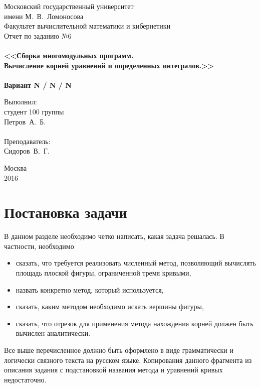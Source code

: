 \documentclass[a4paper,12pt,titlepage,final]{article}
\begin{document}
\begin{titlepage}
    \begin{center}
	{\small \sc Московский государственный университет \\имени М.~В.~Ломоносова\\
	Факультет вычислительной математики и кибернетики\\}
	\vfill
	{\Large \sc Отчет по заданию №6}\\
	~\\
	{\large \bf <<Сборка многомодульных программ. \\
	Вычисление корней уравнений и определенных интегралов.>>}\\ 
	~\\
	{\large \bf Вариант N / N / N}
    \end{center}
    \begin{flushright}
	\vfill {Выполнил:\\
	студент 100 группы\\
	Петров~А.~Б.\\
	~\\
	Преподаватель:\\
	Сидоров~В.~Г.}
    \end{flushright}
    \begin{center}
	\vfill
	{\small Москва\\2016}
    \end{center}
\end{titlepage}

\tableofcontents
\newpage

\section{Постановка задачи}

В данном разделе необходимо четко написать, какая задача решалась. В частности, необходимо
\begin{itemize}
\item сказать, что требуется реализовать численный метод, позволяющий вычислять площадь плоской фигуры,
	ограниченной тремя кривыми,
\item назвать конкретно метод, который используется,
\item сказать, каким методом необходимо искать вершины фигуры,
\item сказать, что отрезок для применения метода нахождения корней должен быть вычислен аналитически.
\end{itemize}
Все выше перечисленное должно быть оформлено в виде грамматически и логически
связного текста на русском языке. Копирования данного фрагмента из описания задания 
с подстановкой названия метода и уравнений кривых недостаточно.
\end{document}

